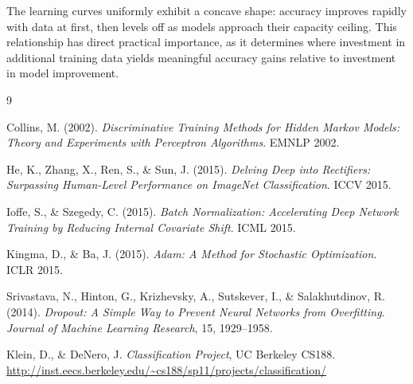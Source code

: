 \documentclass[12pt]{article}
\begin{document}
The learning curves uniformly exhibit a concave shape: accuracy improves rapidly with
data at first, then levels off as models approach their capacity ceiling. This relationship
has direct practical importance, as it determines where investment in additional training
data yields meaningful accuracy gains relative to investment in model improvement.

\begin{thebibliography}{9}

Collins, M. (2002).
\textit{Discriminative Training Methods for Hidden Markov Models: Theory and Experiments
with Perceptron Algorithms}. EMNLP 2002.

He, K., Zhang, X., Ren, S., \& Sun, J. (2015).
\textit{Delving Deep into Rectifiers: Surpassing Human-Level Performance on ImageNet
Classification}. ICCV 2015.

Ioffe, S., \& Szegedy, C. (2015).
\textit{Batch Normalization: Accelerating Deep Network Training by Reducing Internal
Covariate Shift}. ICML 2015.

Kingma, D., \& Ba, J. (2015).
\textit{Adam: A Method for Stochastic Optimization}. ICLR 2015.

Srivastava, N., Hinton, G., Krizhevsky, A., Sutskever, I., \& Salakhutdinov, R. (2014).
\textit{Dropout: A Simple Way to Prevent Neural Networks from Overfitting}.
\textit{Journal of Machine Learning Research}, 15, 1929--1958.

Klein, D., \& DeNero, J.
\textit{Classification Project}, UC Berkeley CS188.
\url{http://inst.eecs.berkeley.edu/~cs188/sp11/projects/classification/}

\end{thebibliography}
\end{document}
